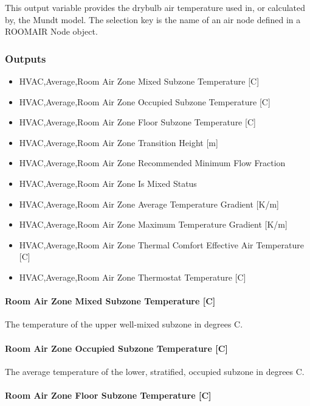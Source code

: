 This output variable provides the drybulb air temperature used in, or calculated by, the Mundt model. The selection key is the name of an air node defined in a ROOMAIR Node object.

\subsubsection{Outputs}\label{outputs-4-014}

\begin{itemize}
\item
  HVAC,Average,Room Air Zone Mixed Subzone Temperature {[}C{]}
\item
  HVAC,Average,Room Air Zone Occupied Subzone Temperature {[}C{]}
\item
  HVAC,Average,Room Air Zone Floor Subzone Temperature {[}C{]}
\item
  HVAC,Average,Room Air Zone Transition Height {[}m{]}
\item
  HVAC,Average,Room Air Zone Recommended Minimum Flow Fraction
\item
  HVAC,Average,Room Air Zone Is Mixed Status \protect\hyperlink{section-1}{}
\item
  HVAC,Average,Room Air Zone Average Temperature Gradient {[}K/m{]}
\item
  HVAC,Average,Room Air Zone Maximum Temperature Gradient {[}K/m{]}
\item
  HVAC,Average,Room Air Zone Thermal Comfort Effective Air Temperature {[}C{]}
\item
  HVAC,Average,Room Air Zone Thermostat Temperature {[}C{]}
\end{itemize}

\paragraph{Room Air Zone Mixed Subzone Temperature {[}C{]}}\label{room-air-zone-mixed-subzone-temperature-c}

The temperature of the upper well-mixed subzone in degrees C.

\paragraph{Room Air Zone Occupied Subzone Temperature {[}C{]}}\label{room-air-zone-occupied-subzone-temperature-c}

The average temperature of the lower, stratified, occupied subzone in degrees C.

\paragraph{Room Air Zone Floor Subzone Temperature {[}C{]}}\label{room-air-zone-floor-subzone-temperature-c}

